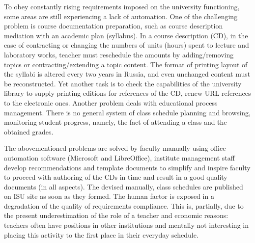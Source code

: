 \documentclass[
]{aiitart}
\begin{document}
To obey constantly rising requirements imposed on the university functioning, some areas are still experiencing a lack of automation. One of the challenging problem is course documentation preparation, such as course description mediation with an academic plan (syllabus).  In a course description (CD), in the case of contracting or changing the numbers of units (hours) spent to lecture and laboratory works, teacher must reschedule the amounts by adding/removing topics or contracting/extending a topic content.  The format of printing layout of the syllabi is altered every two years in Russia, and even unchanged content must be reconstructed.  Yet another task is to check the capabilities of the university library to supply printing editions for references of the CD, renew URL references to the electronic ones.  Another problem deals with educational process management.  There is no general system of class schedule planning and browsing, monitoring student progress, namely, the fact of attending a class and the obtained grades.  %

The abovementioned problems are solved by faculty manually using office automation software (Microsoft and LibreOffice), institute management staff develop recommendations and template documents to simplify and inspire faculty to proceed with authoring of the CDs in time and result in a good quality documents (in all aspects).  The devised manually, class schedules are published on ISU site as soon as they formed.  %
The human factor is exposed in a degradation of the quality of requirements compliance.  This is, partially, due to the present underestimation of the role of a teacher and economic reasons: teachers often have positions in other institutions and mentally not interesting in placing this activity to the first place in their everyday schedule.
\end{document}
